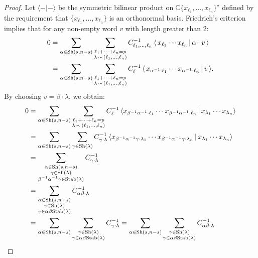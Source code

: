 \documentclass[12pt]{article}
\begin{document}
\begin{proof} Let $\langle - | - \rangle$ be the symmetric bilinear product on $\mathbb{C}\{x_{\ell_1},\ldots,x_{\ell_n}\}^{\star}$ defined by the requirement that $\{x_{\ell_1},\ldots,x_{\ell_n}\}$ is an orthonormal basis.
Friedrich's criterion implies that for any non-empty word $v$ with length greater than $2$:
\begin{align*}
0&=\sum_{\alpha \in {\rm Sh}(s,n-s)}\sum_{\substack{\ell_1 + \cdots + \ell_{n} = p \\ \lambda \,\sim\, (\ell_1,\ldots,\ell_n)}} {C^{-1}_{\ell_1,\ldots,\ell_n}}\, \langle \, x_{\ell_1} \cdots x_{\ell_{n}} \,|\, \alpha\cdot v \,\rangle \\ 
&= \sum_{\alpha \in {\rm Sh}(s,n-s)}\sum_{\substack{\ell_1 + \cdots + \ell_{n} = p \\ \lambda \,\sim\, (\ell_1,\ldots,\ell_n)}} {C^{-1}_{\ell}}\, \langle \, x_{\alpha^{-1}\cdot \ell_1} \cdots x_{\alpha^{-1}\cdot\ell_{n}} \,|\, v \,\rangle. 
\end{align*}
By choosing $v = \beta \cdot \lambda$, we obtain: 
\begin{align*}
0&= \sum_{\alpha\in{\rm Sh}(s,n-s)} \sum_{\substack{\ell_1 + \cdots + \ell_{n} = p \\ \lambda \,\sim\, (\ell_1,\ldots,\ell_n)}} {C^{-1}_{\ell}} \, \langle x_{\beta^{-1}\alpha^{-1}\cdot \ell_1} \cdots x_{\beta^{-1}\alpha^{-1}\cdot\ell_{ n}} \,|\, x_{\lambda_1}\cdots x_{\lambda_n} \rangle \\
&= \sum_{\alpha\in{\rm Sh}(s,n-s)} \sum_{\gamma \in {\rm Sh}(\lambda)} {C^{-1}_{\gamma \cdot\lambda}} \, \langle x_{\beta^{-1}\alpha^{-1}\gamma \cdot \lambda_1} \cdots x_{\beta^{-1}\alpha^{-1}\gamma\cdot\lambda_{n}} \,|\, x_{\lambda_1}\cdots x_{\lambda_n} \rangle \\
&= \sum_{\substack{\alpha\in{\rm Sh}(s,n-s) \\ \gamma \in {\rm Sh}(\lambda)\\ \beta^{-1}\alpha^{-1}\gamma \in {\rm Stab}{(\lambda)}}} {C^{-1}_{\gamma \cdot\lambda}} \\
& = \sum_{\substack{\alpha\in{\rm Sh}(s,n-s) \\ \gamma \in {\rm Sh}(\lambda)\\ \gamma \in \alpha\beta{\rm Stab}{(\lambda)}}} {C^{-1}_{\alpha\beta \cdot\lambda}} \\
&= \sum_{\alpha\in{\rm Sh}(s,n-s)} \sum_{\substack{\gamma \in {\rm Sh}(\lambda)\\ \gamma \in \alpha\beta{\rm Stab}{(\lambda)}}} {C^{-1}_{\gamma \cdot\lambda}} = \sum_{\alpha\in{\rm Sh}(s,n-s)} \sum_{\substack{\gamma \in {\rm Sh}(\lambda)\\ \gamma \in \alpha\beta{\rm Stab}{(\lambda)}}} {C^{-1}_{\alpha\beta \cdot\lambda}}\\

\end{align*}
\end{proof}
\end{document}
